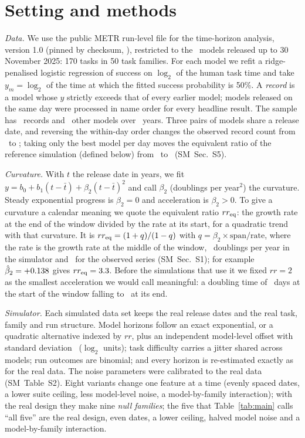 \documentclass[aps,pre,twocolumn,superscriptaddress,nofootinbib,10pt]{revtex4-2}
\newcommand{\SM}{SM}
\newcommand{\rr}{rr}
\newcommand{\rreq}{rr_{\rm eq}}
\begin{document}
\section{Setting and methods}\label{sec:methods}
\emph{Data.} We use the public METR run-level file for the time-horizon analysis, version 1.0 (pinned by checksum, \runsSha), restricted to the \nModels\ models released up to 30 November 2025: 170 tasks in 50 task families. For each model we refit a ridge-penalised logistic regression of success on $\log_2$ of the human task time and take $y_m=\log_2$ of the time at which the fitted success probability is 50\%. A \emph{record} is a model whose $y$ strictly exceeds that of every earlier model; models released on the same day were processed in name order for every headline result. The sample has \nRecords\ records and \nNonRecords\ other models over \spanYears\ years. Three pairs of models share a release date, and reversing the within-day order changes the observed record count from \tieNameN\ to \tieRevN; taking only the best model per day moves the equivalent ratio of the reference simulation (defined below) from \tieRrName\ to \tieRrGroup\ (\SM\ Sec.~S5).

\emph{Curvature.} With $t$ the release date in years, we fit $y=b_0+b_1(t-\bar t)+\beta_2(t-\bar t)^2$ and call $\beta_2$ (doublings per year$^2$) the curvature. Steady exponential progress is $\beta_2=0$ and acceleration is $\beta_2>0$. To give a curvature a calendar meaning we quote the equivalent ratio $\rreq$: the growth rate at the end of the window divided by the rate at its start, for a quadratic trend with that curvature. It is $\rreq=(1+q)/(1-q)$ with $q=\beta_2\times\text{span}/\text{rate}$, where the rate is the growth rate at the middle of the window, \rateNull\ doublings per year in the simulator and \linSlope\ for the observed series (\SM\ Sec.~S1); for example $\hat\beta_2=+0.138$ gives $\rreq=\rrEqAll$. Before the simulations that use it we fixed $\rr=2$ as the smallest acceleration we would call meaningful: a doubling time of \dblStartRrTwo\ days at the start of the window falling to \dblEndRrTwo\ at its end.

\emph{Simulator.} Each simulated data set keeps the real release dates and the real task, family and run structure. Model horizons follow an exact exponential, or a quadratic alternative indexed by $\rr$, plus an independent model-level offset with standard deviation \sigmaM\ ($\log_2$ units); task difficulty carries a jitter shared across models; run outcomes are binomial; and every horizon is re-estimated exactly as for the real data. The noise parameters were calibrated to the real data (\SM\ Table~S2). Eight variants change one feature at a time (evenly spaced dates, a lower suite ceiling, less model-level noise, a model-by-family interaction); with the real design they make nine \emph{null families}; the five that Table~\ref{tab:main} calls ``all five'' are the real design, even dates, a lower ceiling, halved model noise and a model-by-family interaction.
\end{document}
